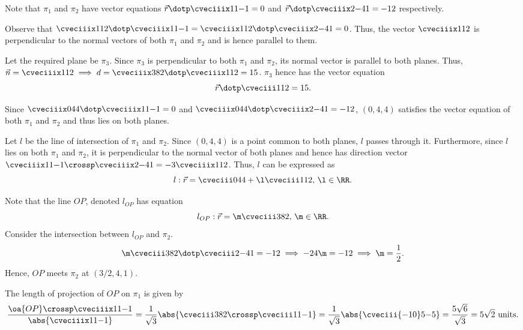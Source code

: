 \begin{solution}
    Note that $\pi_1$ and $\pi_2$ have vector equations $\vec r \dotp \cveciiix11{-1} = 0$ and $\vec r \dotp \cveciiix2{-4}1 = -12$ respectively.

    \begin{ppart}
        Observe that $\cveciiix112 \dotp \cveciiix11{-1} = \cveciiix112 \dotp \cveciiix2{-4}1 = 0$. Thus, the vector $\cveciiix112$ is perpendicular to the normal vectors of both $\pi_1$ and $\pi_2$ and is hence parallel to them.
    \end{ppart}
    \begin{ppart}
        Let the required plane be $\pi_3$. Since $\pi_3$ is perpendicular to both $\pi_1$ and $\pi_2$, its normal vector is parallel to both planes. Thus, $\vec n = \cveciiix112 \implies d = \cveciiix382 \dotp  \cveciiix112 = 15$. $\pi_3$ hence has the vector equation \[\vec r \dotp \cveciii112 = 15.\]
    \end{ppart}
    \begin{ppart}
        Since $\cveciiix044 \dotp \cveciiix11{-1} = 0$ and $\cveciiix044 \dotp \cveciiix2{-4}1 = -12$, $(0, 4, 4)$ satisfies the vector equation of both $\pi_1$ and $\pi_2$ and thus lies on both planes.

        Let $l$ be the line of intersection of $\pi_1$ and $\pi_2$. Since $(0, 4, 4)$ is a point common to both planes, $l$ passes through it. Furthermore, since $l$ lies on both $\pi_1$ and $\pi_2$, it is perpendicular to the normal vector of both planes and hence has direction vector $\cveciiix11{-1} \crossp \cveciiix2{-4}1 = -3\cveciiix112$. Thus, $l$ can be expressed as \[l : \vec r = \cveciii044 + \l\cveciii112, \, \l \in \RR.\]
    \end{ppart}
    \begin{ppart}
        Note that the line $OP$, denoted $l_{OP}$ has equation \[l_{OP} : \vec r = \m \cveciii382, \, \m \in \RR.\] Consider the intersection between $l_{OP}$ and $\pi_2$. \[\m\cveciii382 \dotp \cveciii2{-4}1 = -12 \implies -24\m = -12 \implies \m = \frac12.\] Hence, $OP$ meets $\pi_2$ at $(3/2, 4, 1)$.
    \end{ppart}
    \begin{ppart}
        The length of projection of $OP$ on $\pi_1$ is given by \[\frac{\oa{OP} \crossp \cveciiix11{-1}}{\abs{\cveciiix11{-1}}} = \frac1{\sqrt{3}} \abs{\cveciii382 \crossp \cveciii11{-1}} = \frac1{\sqrt3} \abs{\cveciii{-10}5{-5}} = \frac{5\sqrt{6}}{\sqrt3} = 5\sqrt{2} \text{ units}.\]
    \end{ppart}
\end{solution}

